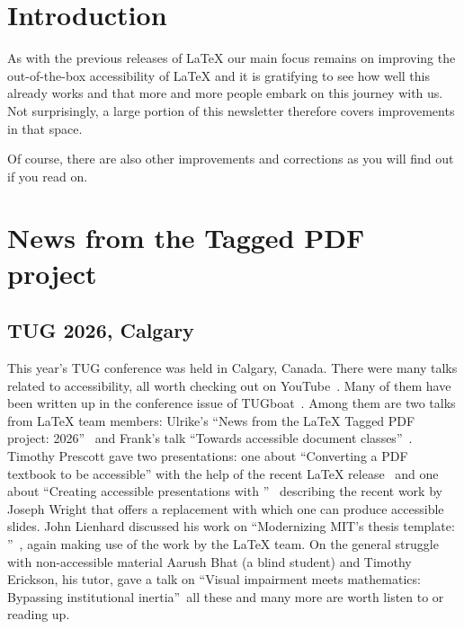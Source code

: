 \documentclass{ltnews}
\providecommand\Dash {\unskip \textemdash}
\let\cls\pkg
\begin{document}
\maketitle
{  \spaceskip=3.33pt 
\tableofcontents}


\setlength{}

\section{Introduction}

As with the previous releases of \LaTeX{} our main focus remains on
improving the out-of-the-box accessibility of \LaTeX{} and it is
gratifying to see how well this already works and that more and more
people embark on this journey with us. Not surprisingly, a large
portion of this newsletter therefore covers improvements in that space.

Of course, there are also other improvements and corrections as you
will find out if you read on.


\section{News from the Tagged PDF project}

\subsection{TUG 2026, Calgary}

This year's TUG conference was held in Calgary, Canada. There were
many talks related to accessibility, all worth checking out on
YouTube~\cite{44:videos}. Many of them have been written up in the
conference issue of TUGboat~\cite{44:isssue47}.  Among them are two
talks from \LaTeX{} team members: Ulrike's \enquote{News from the
  \LaTeX{} Tagged PDF project: 2026}~\cite{44:ufi} and Frank's talk
\enquote{Towards accessible document classes}~\cite{44:fmi}.  Timothy
Prescott gave two presentations: one about \enquote{Converting a PDF
  textbook to be accessible} with the help of the recent \LaTeX{}
release~\cite{44:tpr} and one about \enquote{Creating accessible
  presentations with \cls{ltx-talk}}~\cite[p.\,208]{44:isssue47}
describing the recent work by Joseph Wright that offers a \cls{beamer}
replacement with which one can produce accessible slides.  John
Lienhard discussed his work on \enquote{Modernizing MIT's thesis
  template: \cls{mitthesis.cls}}~\cite[p.\,212]{44:isssue47}, again
making use of the work by the \LaTeX{} team.  On the general struggle
with non-accessible material Aarush Bhat (a blind student) and Timothy
Erickson, his tutor, gave a talk on \enquote{Visual impairment meets
  mathematics: Bypassing institutional
  inertia}~\cite[p.\,195]{44:isssue47}\Dash all these and many more
are worth listen to or reading up.
\end{document}
